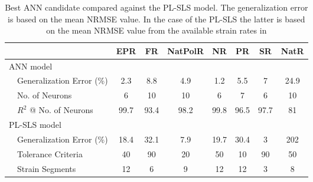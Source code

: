 \begin{table}[htb!]
    \centering
    \caption{Best ANN candidate compared against the PL-SLS model. The generalization error is based on the mean NRMSE value. In the case of the PL-SLS the latter is based on the mean NRMSE value from the available strain rates in }
    \begin{tabular}{p{1em} l ccccccc}
    \toprule
                    &                   & EPR   & FR    & NatPolR & NR  & PR    & SR    & NatR\\
    \hline
    \multicolumn{9}{l}{ANN model}\\
    &Generalization Error (\%)          & 2.3   & 8.8   & 4.9   & 1.2   &5.5    & 7     &   24.9\\
    &No. of Neurons                     & 6     & 10    & 10    & 6     &7      & 6     &   10\\
    &$R^2$ @ No. of Neurons             & 99.7  & 93.4  & 98.2  & 99.8  &96.5   & 97.7  &   81\\
    \midrule
    \multicolumn{9}{l}{PL-SLS model}\\
    &Generalization Error (\%)          & 18.4    & 32.1  & 7.9   & 19.7  & 30.4  & 3   & 202\\
    &Tolerance Criteria                 & 40    & 90    & 20    & 50    & 10    & 90    & 50\\
    &Strain Segments                    & 12    & 6     & 9     & 12    & 12    & 3     & 8\\
    \bottomrule
    \end{tabular}
    \label{tbl:ANNvsSLS}
\end{table}



